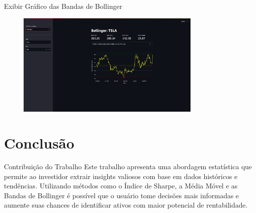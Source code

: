 \documentclass[aspectratio=169]{beamer}
\begin{document}
\begin{frame}{Exibir Gráfico das Bandas de Bollinger}
    \begin{figure}
        \centering
        \includegraphics[width=0.8\textwidth]{F4.png}
    \end{figure}
\end{frame}

\section{Conclusão}
\begin{frame}{Contribuição do Trabalho}
  Este trabalho apresenta uma abordagem estatística que permite ao investidor extrair insights valiosos com base em dados históricos e tendências. Utilizando métodos como o Índice de Sharpe, a Média Móvel e as Bandas de Bollinger é possível que o usuário tome decisões mais informadas e aumente suas chances de identificar ativos com maior potencial de rentabilidade.
\end{frame}



\end{document}

